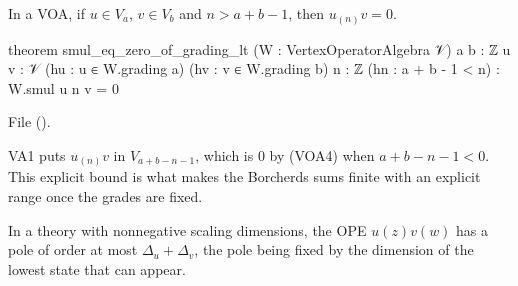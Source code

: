\begin{lemma}\label{l03:lem:gradingbound}
In a VOA, if $u\in V_a$, $v\in V_b$ and $n>a+b-1$, then $u_{(n)}v = 0$.
\end{lemma}
\begin{leancode}
theorem smul_eq_zero_of_grading_lt (W : VertexOperatorAlgebra 𝒱) {a b : ℤ} {u v : 𝒱}
    (hu : u ∈ W.grading a) (hv : v ∈ W.grading b) {n : ℤ} (hn : a + b - 1 < n) :
    W.smul u n v = 0
\end{leancode}
File  ().

\begin{dictionary}
VA1 puts $u_{(n)}v$ in $V_{a+b-n-1}$, which is $0$ by (VOA4) when $a+b-n-1<0$. This explicit bound is
what makes the Borcherds sums finite with an explicit range once the grades are fixed.
\end{dictionary}

\begin{physics}
In a theory with nonnegative scaling dimensions, the OPE $u(z)v(w)$ has a pole of order at most
$\Delta_u+\Delta_v$, the pole being fixed by the dimension of the lowest state that can appear.
\end{physics}

